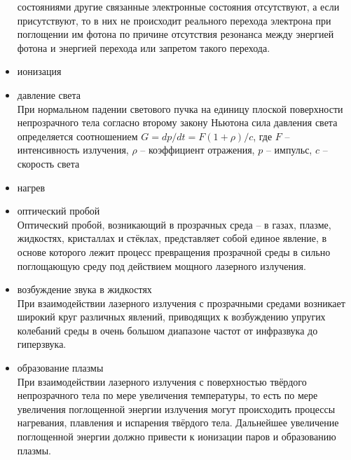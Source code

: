 \begin{itemize}
        состояниями другие связанные электронные состояния отсутствуют, а
        если присутствуют, то в них не происходит реального перехода электрона
        при поглощении им фотона по причине отсутствия резонанса между
        энергией фотона и энергией перехода или запретом такого перехода.
    \item ионизация
    \item давление света \\
        При нормальном падении светового пучка на единицу плоской поверхности
        непрозрачного тела согласно второму закону Ньютона сила давления
        света определяется соотношением \( G = dp/dt = F(1+\rho)/c \), где
        \( F \) -- интенсивность излучения, \( \rho \) -- коэффициент
        отражения, \( p \) -- импульс, \( c \) -- скорость света
    \item нагрев
    \item оптический пробой \\
        Оптический пробой, возникающий в прозрачных среда -- в газах, плазме,
        жидкостях, кристаллах и стёклах, представляет собой единое явление, в
        основе которого лежит процесс превращения прозрачной среды в сильно
        поглощающую среду под действием мощного лазерного излучения.
    \item возбуждение звука в жидкостях \\
        При взаимодействии лазерного излучения с прозрачными средами возникает
        широкий круг различных явлений, приводящих к возбуждению упругих
        колебаний среды в очень большом диапазоне частот от инфразвука до
        гиперзвука.
    \item образование плазмы \\
        При взаимодействии лазерного излучения с поверхностью твёрдого
        непрозрачного тела по мере увеличения температуры, то есть по мере
        увеличения поглощенной энергии излучения могут происходить процессы
        нагревания, плавления и испарения твёрдого тела. Дальнейшее увеличение
        поглощенной энергии должно привести к ионизации паров и образованию
        плазмы.
\end{itemize}
